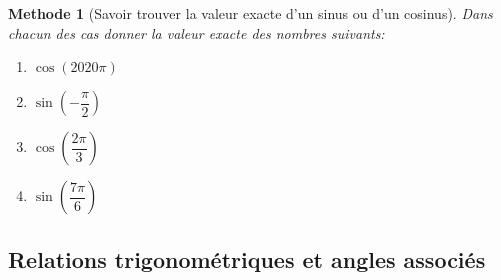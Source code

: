 \documentclass[10pt,a4paper]{article}
\theoremstyle{break}
\newtheorem{Meth}{Methode}
\begin{document}
		\newpage
	\begin{Meth}[Savoir trouver la valeur exacte d'un sinus ou d'un cosinus]
		Dans chacun des cas donner la valeur exacte des nombres suivants:
		\begin{multicols}{4}
			\begin{enumerate}
				\item $\cos(2020\pi)$
				\item $\sin(-\dfrac{\pi}{2})$
				\item $\cos(\dfrac{2\pi}{3})$
				\item $\sin(\dfrac{7\pi}{6})$
			\end{enumerate}
		\end{multicols}
\end{Meth}		
		\subsection{Relations trigonométriques et angles associés}
\end{document}
